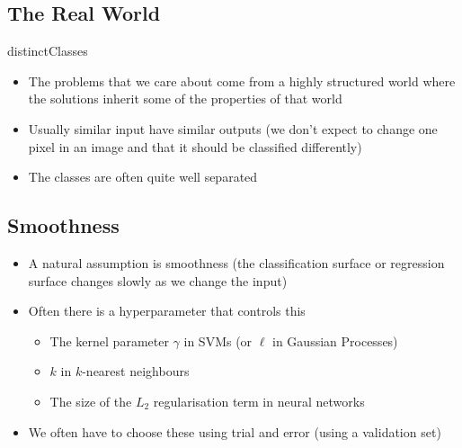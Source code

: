 
\begin{slide}
\section{The Real World}

\begin{PauseHighLight}
  \begin{rightImage}{distinctClasses}
  \begin{itemize}
  \item The problems that we care about come from a highly structured
    world  where the solutions inherit some of the properties of that
    world\pause
  \item Usually similar input have similar outputs (we don't expect to
    change one pixel in an image and that it should be classified
    differently)\pause
  \item The classes are often quite well separated\pause
  \end{itemize}
  \end{rightImage}
\end{PauseHighLight}

\end{slide}


\begin{slide}
\section{Smoothness}

\begin{PauseHighLight}
  \begin{itemize}
  \item A natural assumption is smoothness (the classification surface
    or regression surface changes slowly as we change the input)\pause
  \item Often there is a hyperparameter that controls this
    \begin{itemize}
    \item The kernel parameter $\gamma$ in SVMs (or $\ell$ in Gaussian
      Processes)
    \item $k$ in $k$-nearest neighbours
    \item The size of the $L_2$ regularisation term in neural networks\pause
    \end{itemize}
  \item We often have to choose these using trial and error (using a
    validation set)\pause
  \end{itemize}
\end{PauseHighLight}

\end{slide}

